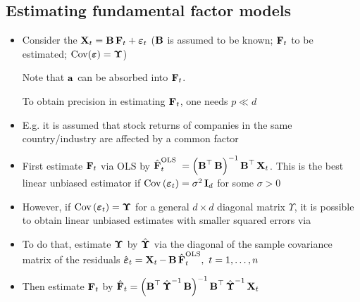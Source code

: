 \subsection*{Estimating fundamental factor models}
\begin{itemize}[leftmargin=*]
    \item Consider the  $\X_{t}=\B \vect{F}_{t}+\vect{\varepsilon}_{t}$ ($\B$ is assumed to be known; $\vect{F}_{t}$ to be estimated; $\operatorname{Cov}(\vect{\varepsilon})=\vect{\Upsilon}$)
    
Note that $\a$ can be absorbed into $\vect{F}_{t}$.

To obtain precision in estimating $\vect{F}_{t}$, one needs $p \ll d$
    \item E.g. it is assumed that stock returns of companies in the same country/industry are affected by a common factor
    \item First estimate $\vect{F}_{t}$ via OLS by $\hat{\vect{F}}_{t}^{\text {OLS }}=\left(\B^{\T} \B\right)^{-1} \B^{\T} \X_{t}$.
This is the best linear unbiased estimator if $\operatorname{Cov}\left(\vect{\varepsilon}_{t}\right)=\sigma^{2} \I_{d}$ for some $\sigma>0$
    \item However, if $\operatorname{Cov}\left(\vect{\varepsilon}_{t}\right)=\vect{\Upsilon}$ for a general $d \times d$ diagonal matrix $\Upsilon$, it is possible to obtain linear unbiased estimates with smaller squared errors via 
    \item To do that, estimate $\vect{\Upsilon}$ by $\hat{\vect{\Upsilon}}$ via the diagonal of the sample covariance matrix of the residuals $\hat{\vect{\varepsilon}}_{t}=\X_{t}-\B \hat{\vect{F}}_{t}^{\mathrm{OLS}},\ t=1, \ldots, n$
    \item Then estimate $\vect{F}_{t}$ by $\hat{\vect{F}}_{t}=\left(\B^{\T} \hat{\vect{\Upsilon}}^{-1} \B\right)^{-1} \B^{\T} \hat{\vect{\Upsilon}}^{-1} \X_{t}$
\end{itemize}






